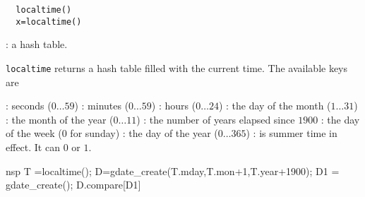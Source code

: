 \begin{mandesc}
\end{mandesc}

\begin{calling_sequence}
\begin{verbatim}
  localtime()
  x=localtime()  
\end{verbatim}
\end{calling_sequence}
\begin{parameters}
  \begin{varlist}
    : a hash table.
  \end{varlist}
\end{parameters}
\begin{mandescription}
  \verb!localtime! returns a hash table filled with the
  current time. The available keys are
  \begin{varlist}
  : seconds ($0 \dots 59$)
  : minutes ($0 \dots 59$)
  : hours ($0 \dots 24$)
  : the day of the month ($1 \dots 31$)
  : the month of the year ($0 \dots 11$)
  : the number of years elapsed since $1900$
  : the day of the week ($0$ for sunday)
  : the day of the year ($0 \dots 365$)
  : is summer time in effect. It can $0$ or $1$.
  \end{varlist}
\end{mandescription} 
\begin{examples}
  \begin{mintednsp}{nsp}
    T  =localtime();
    D=gdate_create(T.mday,T.mon+1,T.year+1900);
    D1 = gdate_create();
    D.compare[D1]
  \end{mintednsp}
\end{examples}
